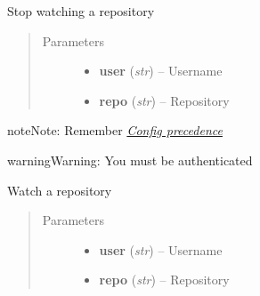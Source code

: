 \documentclass[letterpaper,10pt,english]{sphinxmanual}
\begin{document}
\begin{fulllineitems}
\begin{fulllineitems}
\end{fulllineitems}


\begin{fulllineitems}
\label{repos:pygithub3.services.repos.Watchers.unwatch}
Stop watching a repository
\begin{quote}\begin{description}
\item[{Parameters}] \leavevmode\begin{itemize}
\item {} 
\textbf{user} (\emph{str}) -- Username

\item {} 
\textbf{repo} (\emph{str}) -- Repository

\end{itemize}

\end{description}\end{quote}

\begin{notice}{note}{Note:}
Remember {\hyperref[repos:config-precedence]{\emph{Config precedence}}}
\end{notice}

\begin{notice}{warning}{Warning:}
You must be authenticated
\end{notice}

\end{fulllineitems}


\begin{fulllineitems}
\label{repos:pygithub3.services.repos.Watchers.watch}
Watch a repository
\begin{quote}\begin{description}
\item[{Parameters}] \leavevmode\begin{itemize}
\item {} 
\textbf{user} (\emph{str}) -- Username

\item {} 
\textbf{repo} (\emph{str}) -- Repository

\end{itemize}


\end{description}
\end{quote}
\end{fulllineitems}
\end{fulllineitems}
\end{document}
